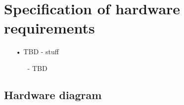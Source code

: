 \section{Specification of hardware requirements}
\begin{enumerate}
	\item[•]TBD - stuff
	\begin{enumerate}
		\item[-]TBD
	\end{enumerate}

\end{enumerate}
\subsection{Hardware diagram}
